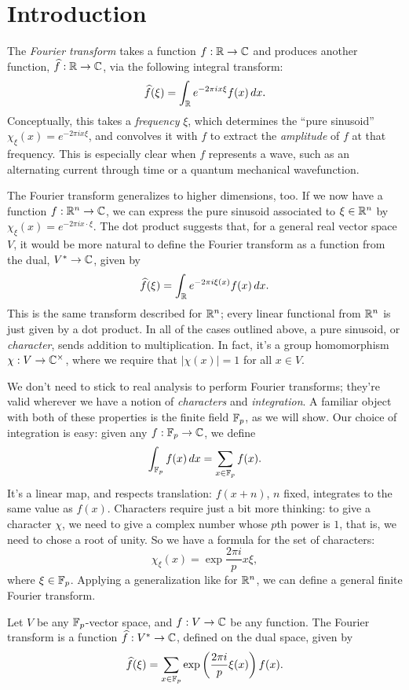 \section{Introduction}\label{sec:intro}

The \emph{Fourier transform} takes a function $f:\mathbb{R}\to\mathbb{C}$ and produces another
function, $\widehat{f}:\mathbb{R}\to\mathbb{C}$, via the following integral transform:
\[ \widehat{f}(\xi) = \int_{\mathbb{R}} e^{-2\pi i x \xi} f(x)\, dx. \]
Conceptually, this takes a \emph{frequency} $\xi$, which determines the ``pure sinusoid''
$\chi_\xi (x) = e^{-2\pi i x \xi}$, and convolves it with $f$ to extract the \emph{amplitude} of $f$ 
at that frequency. This is especially clear when $f$ represents a wave, such as an alternating
current through time or a quantum mechanical wavefunction. 

The Fourier transform generalizes to higher dimensions, too. If we now have a function
$f:\mathbb{R}^n\to\mathbb{C}$, we can express the pure sinusoid associated to $\xi\in\mathbb{R}^n$ by 
$\chi_\xi (x) = e^{-2\pi i x\cdot\xi}$. The dot product suggests that, for a general real vector space $V$, it would be more natural to define the 
Fourier transform as a function from the dual, $V^* \to \mathbb{C}$, given by
\[ \widehat{f}(\xi) = \int_{\mathbb{R}} e^{-2\pi i \xi(x)} f(x)\, dx. \]
This is the same transform described for $\mathbb{R}^n$; every linear functional from $\mathbb{R}^n$ is
just given by a dot product. In all of the cases outlined above, a pure sinusoid, or
\emph{character}, sends addition to multiplication. In fact, it's a group homomorphism 
$\chi:V \to \mathbb{C}^\times$, where we require that $|\chi(x)| = 1$ for all $x\in V$.

We don't need to stick to real analysis to perform Fourier transforms; they're
valid wherever we have a notion of \emph{characters}
and \emph{integration}. A familiar object with both of these properties is the finite field
$\mathbb{F}_p$, as we will show. Our choice of integration is easy: given any $f:\mathbb{F}_p\to\mathbb{C}$, we define
\[ \int_{\mathbb{F}_p} f(x)\, dx = \sum_{x\in\mathbb{F}_p} f(x). \]
It's a linear map, and respects translation: $f(x + n)$, $n$ fixed, integrates to the 
same value as $f(x)$. Characters require just a bit more thinking: to give a character 
$\chi$, we need to give a complex number whose $p$th power is $1$, that is, we need
to chose a root of unity. So we have a formula for the set of characters:
\[ \chi_\xi(x) = \exp {\frac{2\pi i}{p} x \xi}, \]
where $\xi\in\mathbb{F}_p$. Applying a generalization like for $\mathbb{R}^n$, we can define a general
finite Fourier transform.
\begin{defn}\label{defn:intro-FpFT}
    Let $V$ be any $\mathbb{F}_p$-vector space, and $f:V\to \mathbb{C}$ be any function. The Fourier
    transform is a function $\widehat{f}:V^*\to\mathbb{C}$, defined on the dual space, given by
    \[ \widehat{f}(\xi) = 
        \sum_{x\in\mathbb{F}_p} \exp \left(\frac{2\pi i}{p} \xi(x)\right) f(x). \]
\end{defn}

